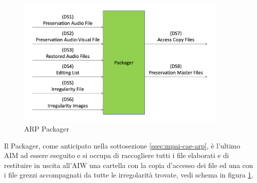 \begin{figure}[H]
    \centering
    \includegraphics[width=0.9\textwidth]{img/packager.png}
    \caption{\ac{ARP} Packager}
    \label{fig:packager}
\end{figure}

Il Packager, come anticipato nella sottosezione \ref{ssec:mpai-cae-arp}, è l'ultimo \ac{AIM} ad essere eseguito e si occupa di raccogliere tutti i file elaborati e di restituire in uscita all'\ac{AIW} una cartella con la copia d'accesso dei file ed una con i file grezzi accompagnati da tutte le irregolarità trovate, vedi schema in figura \ref{fig:packager}.

